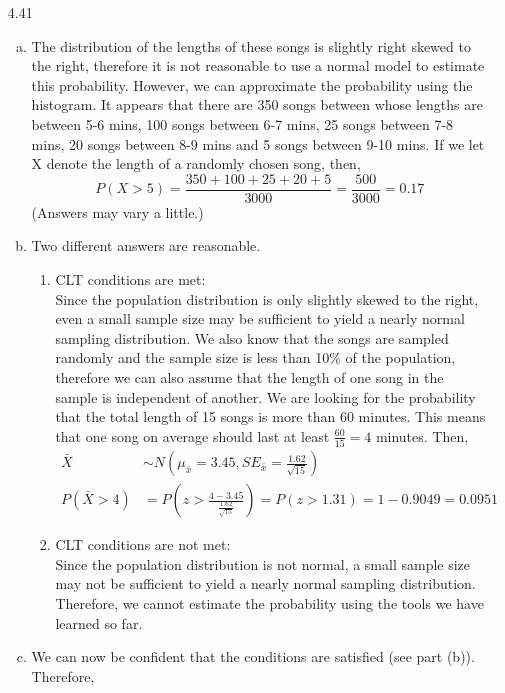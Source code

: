 \documentclass[11pt]{article}
\newenvironment{parts}{
\vspace{-0.25cm}
\begin{enumerate}[(a)]
\setlength{\itemsep}{0mm}
}
{\end{enumerate}
}
\begin{document}
\begin{enumerate}
\item[4.41]
\begin{parts}
\item The distribution of the lengths of these songs is slightly right skewed to the right, therefore it is not reasonable to use a normal model to estimate this probability. However, we can approximate the probability using the histogram. It appears that there are 350 songs between whose lengths are between 5-6 mins, 100 songs between 6-7 mins, 25 songs between 7-8 mins, 20 songs between 8-9 mins and 5 songs between 9-10 mins. If we let X denote the length of a randomly chosen song, then,
\[ P(X > 5) = \frac{350 + 100 + 25 + 20 + 5}{3000} = \frac{500}{3000} = 0.17 \]
(Answers may vary a little.)
\item Two different answers are reasonable. 
\begin{enumerate}[(1)]
\item CLT conditions are met: \\
Since the population distribution is only slightly skewed to the right, even a small sample size may be sufficient to yield a nearly normal sampling distribution. We also know that the songs are sampled randomly and the sample size is less than 10\% of the population, therefore we can also assume that the length of one song in the sample is independent of another.  We are looking for the probability that the total length of 15 songs is more than 60 minutes. This means that one song on average should last at least $\frac{60}{15} = 4$ minutes.  
Then,
\begin{align*}
\bar{X} &\sim N \left( \mu_{\bar{x}} = 3.45, SE_{\bar{x}} = \frac{1.62}{\sqrt{15}}  \right)  \\
P(\bar{X} > 4) &= P \left( z > \frac{4 - 3.45}{\frac{1.62}{\sqrt{15}}} \right)= P(z > 1.31) = 1 - 0.9049 = 0.0951
\end{align*}
\item CLT conditions are not met: \\
Since the population distribution is not normal, a small sample size may not be sufficient to yield a nearly normal sampling distribution. Therefore, we cannot estimate the probability using the tools we have learned so far.
\end{enumerate}
\item We can now be confident that the conditions are satisfied (see part (b)). Therefore,


\end{parts}
\end{enumerate}
\end{document}
